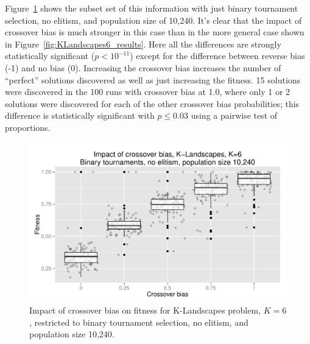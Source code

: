 \documentclass{sig-alternate}
\begin{document}
Figure~\ref{fig:KLandscapes6_strong_results} shows the subset set of this information with just binary tournament 
selection, no elitism, and population size of 10,240. It's clear that the impact of crossover bias is much stronger in this 
case than in the more general case shown in Figure~\ref{fig:KLandscapes6_results}. Here all the differences are strongly 
statistically significant ($p < 10^{-11}$) except for the difference between reverse bias (-1) and no bias (0). Increasing 
the crossover bias increases the number of ``perfect'' solutions discovered as well as just increasing the fitness. 15 
solutions were discovered in the 100 runs with crossover bias at 1.0, where only 1 or 2 solutions were discovered for 
each of the other crossover bias probabilities; this difference is statistically significant with $p \leq 0.03$ using a 
pairwise test of proportions.

\begin{figure}
\centering
\includegraphics[width=0.45 \textwidth]{Plots/KLandscapes6_XO_bias_strong_impact_alpha_075.pdf}
\caption{Impact of crossover bias on fitness for K-Landscapes problem, $K=6$, restricted to binary tournament 
selection, no elitism, and population size 10,240.}
\label{fig:KLandscapes6_strong_results}
\end{figure}

%
%
%
%

%
%
%
%
\end{document}
